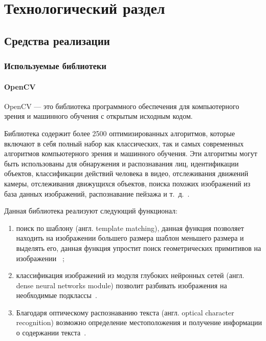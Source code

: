 \chapter{Технологический раздел}

\section{Средства реализации}


\subsection{Используемые библиотеки}

\subsubsection{OpenCV}

OpenCV --- это библиотека программного обеспечения для компьютерного зрения и машинного обучения с открытым исходным кодом.

Библиотека содержит более 2500 оптимизированных алгоритмов, которые включают в себя полный набор как классических, так и самых современных алгоритмов компьютерного зрения и машинного обучения. Эти алгоритмы могут быть использованы для обнаружения и распознавания лиц, идентификации объектов, классификации действий человека в видео, отслеживания движений камеры, отслеживания движущихся объектов, поиска похожих изображений из база данных изображений,  распознавание пейзажа и т.~д.~\cite{about_openCV}.

Данная библиотека реализуют следующий функционал:
\begin{enumerate}
	\item поиск по шаблону (англ. template matching), данная функция позволяет 
	находить на изображении большего размера шаблон меньшего размера и выделять его, данная функция упростит поиск геометрических примитивов на изображении  ~\cite{pattern_matching};
	\item классификация  изображений из модуля глубоких нейронных сетей (англ. dense neural networks module) позволит разбивать изображения на необходимые подклассы~\cite{DL_openCV}.
	
	\item Благодаря оптическому распознаванию текста (англ. optical character recognition) возможно определение местоположения и получение информации о содержании текста~\cite{OCR_openCV}.
\end{enumerate}


